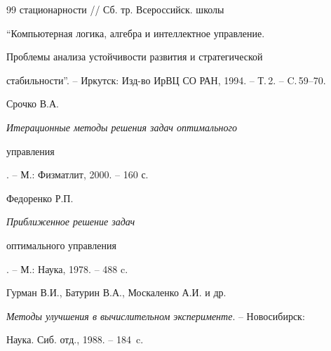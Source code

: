 \begin{thebibliography}{99}
{стационарности} // Сб. тр. Всероссийск. школы


``Компьютерная логика, алгебра и интеллектное управление.


Проблемы анализа устойчивости развития и стратегической


стабильности''. -- Иркутск: Изд-во ИрВЦ СО РАН, 1994. -- Т.\,2. -- C.\,59--70.




Срочко В.А.


{\em Итерационные методы решения задач оптимального 


управления}. -- М.: Физматлит, 2000. -- 160 с.




Федоренко Р.П. {\em Приближенное решение задач 


оптимального управления}. -- М.: Наука, 1978. -- 488 c.




Гурман В.И., Батурин В.А., Москаленко А.И. и др.


{\em Методы улучшения в вычислительном эксперименте}. -- Новосибирск:


Наука. Сиб. отд., 1988. -- 184~c.





\end{thebibliography}





\vskip 2cm












\label{end}









